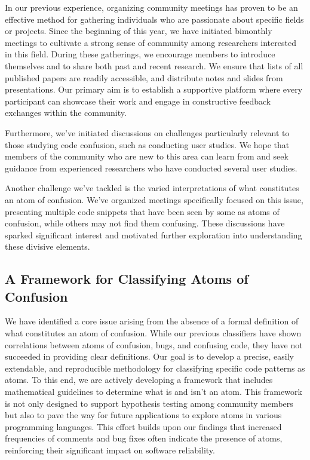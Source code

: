\documentclass[conference]{IEEEtran}
\begin{document}
In our previous experience, organizing community meetings has 
proven to be an effective method for gathering individuals who 
are passionate about specific fields or projects. Since the 
beginning of this year, we have initiated bimonthly meetings 
to cultivate a strong sense of community among researchers 
interested in this field. During these gatherings, we 
encourage members to introduce themselves and to share both 
past and recent research. We ensure that lists of all 
published papers are readily accessible, and distribute notes 
and slides from presentations. Our primary aim is to establish 
a supportive platform where every participant can showcase 
their work and engage in constructive feedback exchanges 
within the community.

Furthermore, we've initiated discussions on challenges 
particularly relevant to those studying code confusion, such 
as conducting user studies. We hope that members of the 
community who are new to this area can learn from and seek 
guidance from experienced researchers who have conducted 
several user studies.

Another challenge we've tackled is the varied interpretations 
of what constitutes an atom of confusion. We've organized 
meetings specifically focused on this issue, presenting 
multiple code snippets that have been seen by some as atoms of 
confusion, while others may not find them confusing. These 
discussions have sparked significant interest and motivated 
further exploration into understanding these divisive 
elements.


\subsection{A Framework for Classifying Atoms of Confusion}

We have identified a core issue arising from the absence of a 
formal definition of what constitutes an atom of confusion. 
While our previous classifiers \cite{gopstein2018prevalence} 
have shown correlations between atoms of confusion, bugs, and 
confusing code, they have not succeeded in providing clear 
definitions. Our goal is to develop a precise, easily 
extendable, and reproducible methodology for classifying 
specific code patterns as atoms. To this end, we are actively 
developing a framework that includes mathematical guidelines 
to determine what is and isn't an atom. This framework is not 
only designed to support hypothesis testing among community 
members but also to pave the way for future applications to 
explore atoms in various programming languages. This effort 
builds upon our findings that increased frequencies of 
comments and bug fixes often indicate the presence of atoms, 
reinforcing their significant impact on software reliability.
\end{document}
